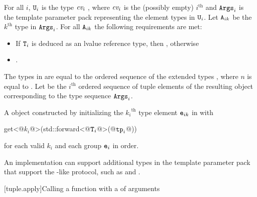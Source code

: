 \documentclass{wg21}
\begin{document}
\begin{itemdescr}
\begin{removedblock}
    \pnum
    \expects
    For all $i$, $\texttt{U}_i$ is the type
    $\textit{cv}_i$ , where $\textit{cv}_i$ is the (possibly empty) $i^\text{th}$
     and $\texttt{Args}_i$ is the template parameter pack representing the element
    types in $\texttt{U}_i$. Let $\texttt{A}_{ik}$ be the ${k}^\text{th}$ type in $\texttt{Args}_i$. For all
    $\texttt{A}_{ik}$ the following requirements are met:


    \begin{itemize}
        \item If $\texttt{T}_i$ is deduced as an lvalue reference type, then
        , otherwise
        \item {}.
    \end{itemize}

    \pnum
    \remarks
    The types in  are equal to the ordered
    sequence of the extended types
    ,
    where $n$ is
    equal to . Let  be the $i^\text{th}$
    ordered sequence of tuple elements of the resulting  object
    corresponding to the type sequence $\texttt{Args}_i$.

    \pnum
    \returns
    A  object constructed by initializing the ${k_i}^\text{th}$
    type element $\texttt{e}_{ik}$ in  with
    \begin{codeblock}
        get<@$k_i$@>(std::forward<@$\texttt{T}_i$@>(@$\texttt{tp}_i$@))
    \end{codeblock}
    for each valid $k_i$ and each group $\texttt{e}_i$ in order.

    \begin{note}
        An implementation can support additional types in the template parameter
        pack  that support the -like protocol, such as
         and .
    \end{note}

    \end{removedblock}


\end{itemdescr}



[tuple.apply]{Calling a function with a  of arguments}
\end{document}
